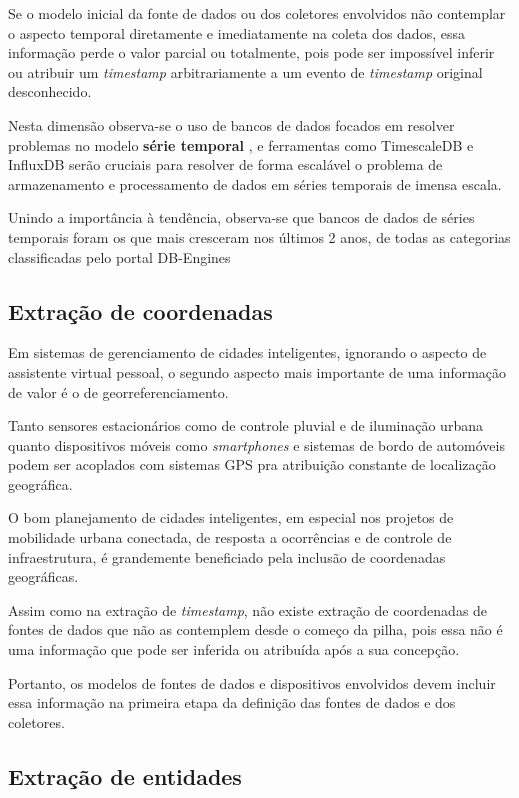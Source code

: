 Se o modelo inicial da fonte de dados ou dos coletores envolvidos não contemplar o aspecto temporal diretamente e imediatamente na coleta dos dados, essa informação perde o valor parcial ou totalmente, pois pode ser impossível inferir ou atribuir um \textit{timestamp} arbitrariamente a um evento de \textit{timestamp} original desconhecido.

Nesta dimensão observa-se o uso de bancos de dados focados em resolver problemas no modelo \textbf{série temporal} \cite{influxdata:explained}, e ferramentas como TimescaleDB \cite{timescaledb} e InfluxDB \cite{influxdb} serão cruciais para resolver de forma escalável o problema de armazenamento e processamento de dados em séries temporais de imensa escala.

Unindo a importância à tendência, observa-se que bancos de dados de séries temporais foram os que mais cresceram nos últimos 2 anos, de todas as categorias classificadas pelo portal DB-Engines \cite{dbengines:trends}

\subsection{Extração de coordenadas} \label{ss:extracao_de_coordenadas}

Em sistemas de gerenciamento de cidades inteligentes, ignorando o aspecto de assistente virtual pessoal, o segundo aspecto mais importante de uma informação de valor é o de georreferenciamento.

Tanto sensores estacionários como de controle pluvial e de iluminação urbana quanto dispositivos móveis como \textit{smartphones} e sistemas de bordo de automóveis podem ser acoplados com sistemas GPS pra atribuição constante de localização geográfica.

O bom planejamento de cidades inteligentes, em especial nos projetos de mobilidade urbana conectada, de resposta a ocorrências e de controle de infraestrutura, é grandemente beneficiado pela inclusão de coordenadas geográficas.

Assim como na extração de \textit{timestamp}, não existe extração de coordenadas de fontes de dados que não as contemplem desde o começo da pilha, pois essa não é uma informação que pode ser inferida ou atribuída após a sua concepção. 

Portanto, os modelos de fontes de dados e dispositivos envolvidos devem incluir essa informação na primeira etapa da definição das fontes de dados e dos coletores.

\subsection{Extração de entidades} \label{ss:extracao_de_entidades}

